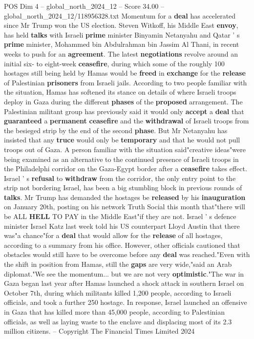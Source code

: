 \begin{textsample}{POS Dim 4 – global\_north\_2024\_12 – Score 34.00 – global\_north\_2024\_12/118956328.txt}
Momentum for a \textbf{deal} has accelerated since Mr Trump won the US election.
Steven Witkoff, his Middle East \textbf{envoy}, has held \textbf{talks} with Israeli \textbf{prime} minister Binyamin Netanyahu and Qatar ' s \textbf{prime} minister, Mohammed bin Abdulrahman bin Jassim Al Thani, in recent weeks to push for an \textbf{agreement}.
The latest \textbf{negotiations} revolve around an initial six- to eight-week \textbf{ceasefire}, during which some of the roughly 100 hostages still being held by Hamas would be \textbf{freed} in \textbf{exchange} for the \textbf{release} of Palestinian \textbf{prisoners} from Israeli jails.
According to two people familiar with the situation, Hamas has softened its stance on details of where Israeli troops deploy in Gaza during the different \textbf{phases} of the \textbf{proposed} arrangement.
The Palestinian militant group has previously said it would only \textbf{accept} a \textbf{deal} that \textbf{guaranteed} a \textbf{permanent} \textbf{ceasefire} and the \textbf{withdrawal} of Israeli troops from the besieged strip by the end of the second \textbf{phase}.
But Mr Netanyahu has insisted that any \textbf{truce} would only be \textbf{temporary} and that he would not pull troops out of Gaza.
A person familiar with the situation said"creative ideas"were being examined as an alternative to the continued presence of Israeli troops in the Philadelphi corridor on the Gaza-Egypt border after a \textbf{ceasefire} takes effect.
Israel ' s \textbf{refusal} to \textbf{withdraw} from the corridor, the only entry point to the strip not bordering Israel, has been a big stumbling block in previous rounds of \textbf{talks}.
Mr Trump has demanded the hostages be \textbf{released} by his \textbf{inauguration} on January 20th, posting on his network Truth Social this month that"there will be ALL \textbf{HELL} TO PAY in the Middle East"if they are not.
Israel ' s defence minister Israel Katz last week told his US counterpart Lloyd Austin that there was"a chance"for a \textbf{deal} that would allow for the \textbf{release} of all hostages, according to a summary from his office.
However, other officials cautioned that obstacles would still have to be overcome before any \textbf{deal} was reached."Even with the shift in position from Hamas, still the \textbf{gaps} are very wide,"said an Arab diplomat."We see the momentum... but we are not very \textbf{optimistic}."The war in Gaza began last year after Hamas launched a shock attack in southern Israel on October 7th, during which militants killed 1,200 people, according to Israeli officials, and took a further 250 hostage.
In response, Israel launched an offensive in Gaza that has killed more than 45,000 people, according to Palestinian officials, as well as laying waste to the enclave and displacing most of its 2.3 million citizens. -- Copyright The Financial Times Limited 2024


\end{textsample}
